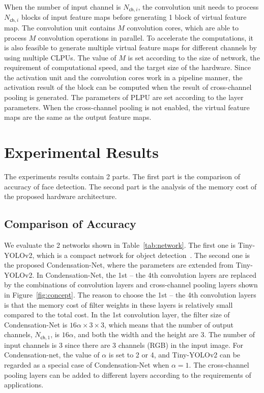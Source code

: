 \documentclass[10pt,twocolumn,letterpaper]{article}
\begin{document}
When the number of input channel is $N_{\mathsf{ch},i}$, the convolution unit needs to process $N_{\mathsf{ch},i}$ blocks of input feature maps before generating 1 block of virtual feature map. The convolution unit contains $M$ convolution cores, which are able to process $M$ convolution operations in parallel. To accelerate the computations, it is also feasible to generate multiple virtual feature maps for different channels by using multiple CLPUs. The value of $M$ is set according to the size of network, the requirement of computational speed, and the target size of the hardware. Since the activation unit and the convolution cores work in a pipeline manner, the activation result of the block can be computed when the result of cross-channel pooling is generated. The parameters of PLPU are set according to the layer parameters. When the cross-channel pooling is not enabled, the virtual feature maps are the same as the output feature maps.

\section{Experimental Results}
\label{sec:results}

The experiments results contain 2 parts. The first part is the comparison of accuracy of face detection. The second part is the analysis of the memory cost of the proposed hardware architecture.



\subsection{Comparison of Accuracy}
\label{subsec:comparison}

We evaluate the 2 networks shown in Table~\ref{tab:network}. The first one is Tiny-YOLOv2, which is a compact network for object detection~\cite{Redmon17, Wai18}. The second one is the proposed Condensation-Net, where the parameters are extended from Tiny-YOLOv2. In Condensation-Net, the 1st -- the 4th convolution layers are replaced by the combinations of convolution layers and cross-channel pooling layers shown in Figure~\ref{fig:concept}. The reason to choose the 1st -- the 4th convolution layers is that the memory cost of filter weights in these layers is relatively small compared to the total cost. In the 1st convolution layer, the filter size of Condensation-Net is $16 \alpha \times 3 \times 3$, which means that the number of output channels, $N_{\mathsf{ch},1} $, is $16 \alpha$, and both the width and the height are 3. The number of input channels is 3 since there are 3 channels (RGB) in the input image. For Condensation-net, the value of $\alpha$ is set to 2 or 4, and Tiny-YOLOv2 can be regarded as a special case of Condensation-Net when $\alpha = 1$. The cross-channel pooling layers can be added to different layers according to the requirements of applications.
\end{document}
